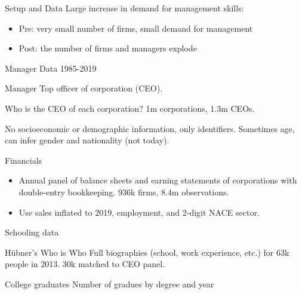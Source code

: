\documentclass[
  ignorenonframetext,
  aspectratio=1610,
]{beamer}
\providecommand{\tightlist}{%
  \setlength{\itemsep}{0pt}\setlength{\parskip}{0pt}}
\begin{document}
\begin{frame}{Setup and Data}
\protect\hypertarget{setup-and-data-1}{}
Large increase in demand for management skills:

\begin{itemize}
\tightlist
\item
  Pre: very small number of firms, small demand for management
\item
  Post: the number of firms and managers explode
\end{itemize}
\end{frame}

\begin{frame}{Manager Data 1985-2019}
\protect\hypertarget{manager-data-1985-2019}{}
\begin{block}{Manager}
\protect\hypertarget{manager}{}
Top officer of corporation (CEO).

Who is the CEO of each corporation? 1m corporations, 1.3m CEOs.

No socioeconomic or demographic information, only identifiers. Sometimes
age, can infer gender and nationality (not today).
\end{block}
\end{frame}

\begin{frame}{Financials}
\protect\hypertarget{financials}{}
\begin{itemize}
\tightlist
\item
  Annual panel of balance sheets and earning statements of corporations
  with double-entry bookkeeping. 936k firms, 8.4m observations.
\item
  Use sales inflated to 2019, employment, and 2-digit NACE sector.
\end{itemize}
\end{frame}

\begin{frame}{Schooling data}
\protect\hypertarget{schooling-data}{}
\begin{block}{Hübner's Who is Who}
\protect\hypertarget{huxfcbners-who-is-who}{}
Full biographies (school, work experience, etc.) for 63k people in 2013.
30k matched to CEO panel.
\end{block}

\begin{block}{College graduates}
\protect\hypertarget{college-graduates}{}
Number of gradues by degree and year
\end{block}
\end{frame}
\end{document}
